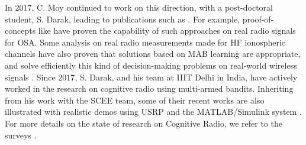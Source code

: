 In $2017$, C. Moy continued to work on this direction, with a post-doctoral student, S. Darak, leading to publications such as
\cite{darak2016bayesian,Darak16}.
%
For example, proof-of-concepts like \cite{kumar2016two} have proven the capability of such approaches on real radio signals for OSA.
%
Some analysis on real radio measurements made for HF ionospheric channels have also proven that solutions based on MAB learning are appropriate, and solve efficiently this kind of decision-making problems on real-world wireless signals \cite{Melian15}.
%
Since $2017$, S. Darak, and his team at IIIT Delhi in India, have actively worked in the research on cognitive radio using multi-armed bandits.
Inheriting from his work with the SCEE team,
some of their recent works are also illustrated with realistic demos using USRP and the MATLAB/Simulink system
\cite{KumarYadav2018,SawantKumar2018,JoshiKumar2018}.
%
For more details on the state of research on Cognitive Radio, we refer to the surveys \cite{garhwal2012survey,marinho2012cognitive}.



